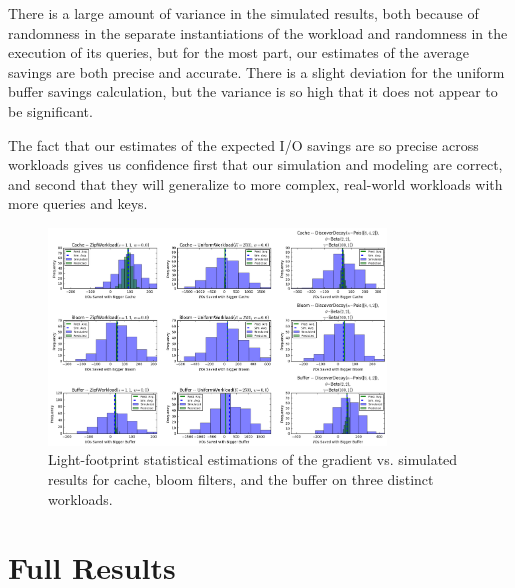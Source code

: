 \documentclass{cidr-2019}
\begin{document}
There is a large amount of variance in the simulated results, both because of
randomness in the separate instantiations of the workload and randomness in
the execution of its queries, but for the most part, our estimates of the average
savings are both precise and accurate. There is a slight deviation for the uniform
buffer savings calculation, but the variance is so high that it does not appear
to be significant.

The fact that our estimates of the expected I/O savings are so precise across
workloads gives us confidence first that our simulation and modeling are correct,
and second that they will generalize to more complex, real-world workloads
with more queries and keys.

\begin{figure}[!htb]
\centering
\includegraphics[width=0.8\textwidth]{all-savings.png}
\caption{Light-footprint statistical estimations of the gradient vs. simulated
results for cache, bloom filters, and the buffer on three distinct workloads.}
\label{fig:savings}
\end{figure}


\clearpage

\section{Full Results} \label{fullresults}
\end{document}
